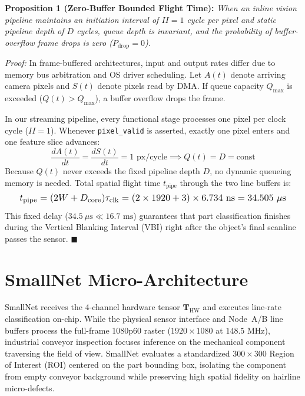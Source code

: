 \documentclass[conference]{IEEEtran}
\begin{document}
\textbf{Proposition 1 (Zero-Buffer Bounded Flight Time):} \textit{When an inline vision pipeline maintains an initiation interval of $II=1$ cycle per pixel and static pipeline depth of $D$ cycles, queue depth is invariant, and the probability of buffer-overflow frame drops is zero ($P_{\text{drop}} = 0$).}

\textit{Proof:} In frame-buffered architectures, input and output rates differ due to memory bus arbitration and OS driver scheduling. Let $A(t)$ denote arriving camera pixels and $S(t)$ denote pixels read by DMA. If queue capacity $Q_{\text{max}}$ is exceeded ($Q(t) > Q_{\text{max}}$), a buffer overflow drops the frame.

In our streaming pipeline, every functional stage processes one pixel per clock cycle ($II=1$). Whenever \texttt{pixel\_}\allowbreak\texttt{valid} is asserted, exactly one pixel enters and one feature slice advances:
\begin{equation}
\frac{dA(t)}{dt} = \frac{dS(t)}{dt} = 1\text{ px/cycle} \implies Q(t) = D = \text{const}
\end{equation}
Because $Q(t)$ never exceeds the fixed pipeline depth $D$, no dynamic queueing memory is needed. Total spatial flight time $t_{\text{pipe}}$ through the two line buffers is:
\begin{equation}
\resizebox{0.94\columnwidth}{!}{$
t_{\text{pipe}} = (2W + D_{\text{core}})\tau_{\text{clk}} = (2 \times 1920 + 3) \times 6.734\text{ ns} = 34.505\ \mu\text{s}
$}
\end{equation}
This fixed delay ($34.5\ \mu\text{s} \ll 16.7\text{ ms}$) guarantees that part classification finishes during the Vertical Blanking Interval (VBI) right after the object's final scanline passes the sensor. $\blacksquare$

\section{SmallNet Micro-Architecture}
\label{sec:smallnet}

SmallNet receives the 4-channel hardware tensor $\mathbf{T}_{\text{HW}}$ and executes line-rate classification on-chip. While the physical sensor interface and Node~A/B line buffers process the full-frame 1080p60 raster ($1920 \times 1080$ at $148.5\text{ MHz}$), industrial conveyor inspection focuses inference on the mechanical component traversing the field of view. SmallNet evaluates a standardized $300 \times 300$ Region of Interest (ROI) centered on the part bounding box, isolating the component from empty conveyor background while preserving high spatial fidelity on hairline micro-defects.
\end{document}
